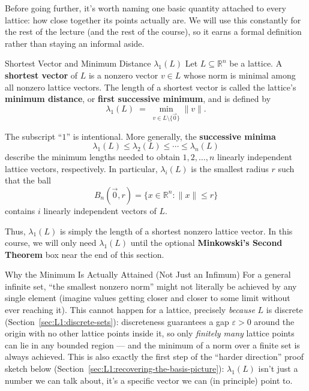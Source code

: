 Before going further, it's worth naming one basic quantity attached to every lattice: how close together its points actually are. We will use this constantly for the rest of the lecture (and the rest of the course), so it earns a formal definition rather than staying an informal aside.


\begin{defbox}{Shortest Vector and Minimum Distance $\lambda_1(L)$}
Let $L \subseteq \mathbb{R}^n$ be a lattice. A \textbf{shortest vector} of $L$ is a nonzero vector $v \in L$ whose norm is minimal among all nonzero lattice vectors. The length of a shortest vector is called the lattice's \textbf{minimum distance}, or \textbf{first successive minimum}, and is defined by
\[
\lambda_1(L)
\;=\;
\min_{v \in L \setminus \{\vec{0}\}} \|v\|.
\]

The subscript ``$1$'' is intentional. More generally, the \textbf{successive minima}
\[
\lambda_1(L) \leq \lambda_2(L) \leq \cdots \leq \lambda_n(L)
\]
describe the minimum lengths needed to obtain $1,2,\ldots,n$ linearly independent lattice vectors, respectively. In particular, $\lambda_i(L)$ is the smallest radius $r$ such that the ball
\[
B_n(\vec{0},r)
=
\{x\in\mathbb{R}^n : \|x\|\leq r\}
\]
contains $i$ linearly independent vectors of $L$.

Thus, $\lambda_1(L)$ is simply the length of a shortest nonzero lattice vector. In this course, we will only need $\lambda_1(L)$ until the optional \textbf{Minkowski's Second Theorem} box near the end of this section.
\end{defbox}

\begin{rmkbox}{Why the Minimum Is Actually Attained (Not Just an Infimum)}
For a general infinite set, ``the smallest nonzero norm'' might not literally be achieved by any single element (imagine values getting closer and closer to some limit without ever reaching it). This cannot happen for a lattice, precisely \emph{because} $L$ is discrete (Section~\ref{sec:L1:discrete-sets}): discreteness guarantees a gap $\varepsilon>0$ around the origin with no other lattice points inside it, so only \emph{finitely many} lattice points can lie in any bounded region --- and the minimum of a norm over a finite set is always achieved. This is also exactly the first step of the ``harder direction'' proof sketch below (Section~\ref{sec:L1:recovering-the-basis-picture}): $\lambda_1(L)$ isn't just a number we can talk about, it's a specific vector we can (in principle) point to.
\end{rmkbox}

